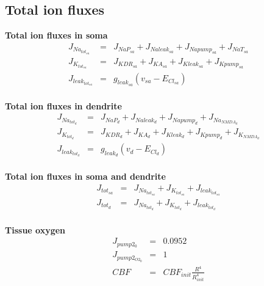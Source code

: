 \documentclass[fleqn]{report}
\numberwithin{equation}{section}
\numberwithin{equation}{section}
\begin{document}
         \subsection{Total ion fluxes}
            \textbf{Total ion fluxes in soma}
            \begin{eqnarray}
            J_{Na_{tot_{{sa}}}} &=& J_{NaP_{sa}} + J_{Naleak_{sa}} + J_{Napump_{sa}} + J_{NaT_{sa}}\\
            J_{K_{tot_{{sa}}}}  &=& J_{KDR_{sa}} + J_{KA_{sa}} + J_{Kleak_{sa}} + J_{Kpump_{sa}}\\
            J_{leak_{tot_{sa}}} &=& g_{leak_{sa}}  (v_{sa} - E_{Cl_{sa}})\\ %
            \end{eqnarray}

            
             \textbf{Total ion fluxes in dendrite}
            \begin{eqnarray}
           J_{Na_{tot_{d}}}  &=& J_{NaP_{d}} + J_{Naleak_{d}} + J_{Napump_{d}} + J_{Na_{NMDA_{d}}}\\
           J_{K_{tot_{d}}}   &=& J_{KDR_{d}} + J_{KA_{d}} + J_{Kleak_{d}} + J_{Kpump_{d}} + J_{K_{NMDA_{d}}}\\
           J_{leak_{tot_{d}}}  &=& g_{leak_{d}} (v_{d} - E_{Cl_{d}})\\ %
              \end{eqnarray}          
              
            \textbf{Total ion fluxes in soma and dendrite}
            \begin{eqnarray}
            J_{tot_{sa}}    &=& J_{Na_{tot_{sa}}} + J_{K_{tot_{sa}}} + J_{leak_{tot_{sa}}}\\
            J_{tot_{d}}     &=& J_{Na_{tot_{d}}} + J_{K_{tot_{d}}} + J_{leak_{tot_{d}}}\\
            \end{eqnarray}

     \textbf{ Tissue oxygen }
     \begin{eqnarray}
            J_{pump2_{0}}       &=& 0.0952\\   %
           J_{pump2_{O2_{0}}}    &=& 1\\       %
            CBF             &=& CBF_{init} \frac{R^4}{R_{init}^4}\\
     \end{eqnarray}
\end{document}
